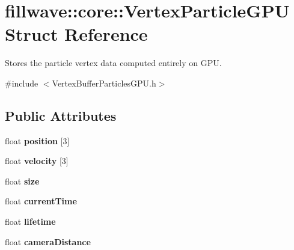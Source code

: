 \hypertarget{structfillwave_1_1core_1_1VertexParticleGPU}{}\section{fillwave\+:\+:core\+:\+:Vertex\+Particle\+G\+P\+U Struct Reference}
\label{structfillwave_1_1core_1_1VertexParticleGPU}


Stores the particle vertex data computed entirely on G\+P\+U.  




{\ttfamily \#include $<$Vertex\+Buffer\+Particles\+G\+P\+U.\+h$>$}

\subsection*{Public Attributes}
\begin{DoxyCompactItemize}
\item 
\hypertarget{structfillwave_1_1core_1_1VertexParticleGPU_abd333afcde75c1ce13ae580678523c12}{}float {\bfseries position} \mbox{[}3\mbox{]}\label{structfillwave_1_1core_1_1VertexParticleGPU_abd333afcde75c1ce13ae580678523c12}

\item 
\hypertarget{structfillwave_1_1core_1_1VertexParticleGPU_a6ee016852fdc24aa41a177530f28991a}{}float {\bfseries velocity} \mbox{[}3\mbox{]}\label{structfillwave_1_1core_1_1VertexParticleGPU_a6ee016852fdc24aa41a177530f28991a}

\item 
\hypertarget{structfillwave_1_1core_1_1VertexParticleGPU_ae1f534fed28079cb6db8fd18e742874c}{}float {\bfseries size}\label{structfillwave_1_1core_1_1VertexParticleGPU_ae1f534fed28079cb6db8fd18e742874c}

\item 
\hypertarget{structfillwave_1_1core_1_1VertexParticleGPU_a47e5a2c96959fe9717585c27d1c2267e}{}float {\bfseries current\+Time}\label{structfillwave_1_1core_1_1VertexParticleGPU_a47e5a2c96959fe9717585c27d1c2267e}

\item 
\hypertarget{structfillwave_1_1core_1_1VertexParticleGPU_a804e4c34611f72e41f0180a7e443a235}{}float {\bfseries lifetime}\label{structfillwave_1_1core_1_1VertexParticleGPU_a804e4c34611f72e41f0180a7e443a235}

\item 
\hypertarget{structfillwave_1_1core_1_1VertexParticleGPU_aae1392382776880874f6289e04b5fb5b}{}float {\bfseries camera\+Distance}\label{structfillwave_1_1core_1_1VertexParticleGPU_aae1392382776880874f6289e04b5fb5b}

\end{DoxyCompactItemize}


